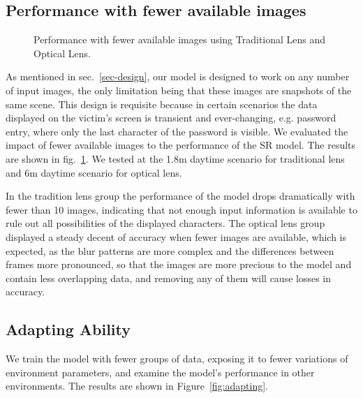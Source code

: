 \subsection{Performance with fewer available images}
\begin{figure}[!t]
    \centering
    \hfill
    \caption{Performance with fewer available images using Traditional Lens and Optical Lens.}
    \label{fig:number}
\end{figure}
As mentioned in sec.~\ref{sec-design}, our model is designed to work on any number of input images, the only limitation being that these images are snapshots of the same scene. This design is requisite because in certain scenarios the data displayed on the victim's screen is transient and ever-changing, e.g. password entry, where only the last character of the password is visible. We evaluated the impact of fewer available images to the performance of the SR model. The results are shown in fig.~\ref{fig:number}. We tested at the 1.8m daytime scenario for traditional lens and 6m daytime scenario for optical lens.

In the tradition lens group the performance of the model drops dramatically with fewer than 10 images, indicating that not enough input information is available to rule out all possibilities of the displayed characters. The optical lens group displayed a steady decent of accuracy when fewer images are available, which is expected, as the blur patterns are more complex and the differences between frames more pronounced, so that the images are more precious to the model and contain less overlapping data, and removing any of them will cause losses in accuracy.

\subsection{Adapting Ability}
We train the model with fewer groups of data, exposing it to fewer variations of environment parameters, and examine the model's performance in other environments. The results are shown in Figure~\ref{fig:adapting}.

